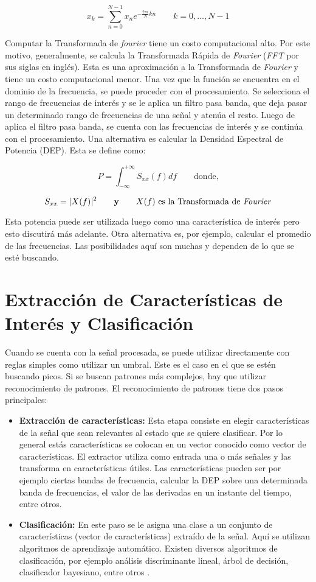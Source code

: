 $$ x_{k} = \sum_{n=0}^{N-1} x_{n}e^{-\frac{2 \pi i}{N}kn} \qquad k = 0,\hdots, N - 1 $$

Computar la Transformada de \emph{fourier} tiene un costo computacional alto. Por este motivo, generalmente, se calcula la Transformada Rápida de \emph{Fourier} (\emph{FFT} por sus siglas en inglés). Esta es una aproximación a la Transformada de \emph{Fourier} y tiene un costo computacional menor. Una vez que la función se encuentra en el dominio de la frecuencia, se puede proceder con el procesamiento. Se selecciona el rango de frecuencias de interés y se le aplica un filtro pasa banda, que deja pasar un determinado rango de frecuencias de una señal y atenúa el resto. Luego de aplica el filtro pasa banda,  se cuenta con las frecuencias de interés y se continúa con el procesamiento. Una alternativa es calcular la Densidad Espectral de Potencia (DEP). Esta se define como:

$$ P = \int_{-\infty}^{+\infty} S_{xx} (f) df \qquad  \textrm{donde,}$$

$$ S_{xx} = |X(f)|^{2} \qquad \textbf{y} \qquad X(f) \textrm{ es la Transformada de \emph{Fourier}} $$

Esta potencia puede ser utilizada luego como una característica de interés pero esto discutirá más adelante. Otra alternativa  es, por ejemplo, calcular el promedio de las frecuencias. Las posibilidades aquí son muchas y dependen de lo que se esté buscando.

\section{Extracción de Características de Interés y Clasificación}

Cuando se cuenta con la señal procesada, se puede utilizar directamente con reglas simples como utilizar un umbral. Este es el caso en el que se estén buscando picos. Si se buscan patrones más complejos, hay que utilizar reconocimiento de patrones. El reconocimiento de patrones tiene dos pasos principales:

\begin{itemize}
  \item \textbf{Extracción de características:} Esta etapa consiste en elegir características de la señal que sean relevantes al estado que se quiere clasificar. Por lo general estás características se colocan en un vector conocido como vector de características. El extractor utiliza como entrada una o más señales y las transforma en características útiles. Las características pueden ser por ejemplo ciertas bandas de frecuencia, calcular la DEP sobre una determinada banda de frecuencias, el valor de las derivadas en un instante del tiempo, entre otros. 
  \item \textbf{Clasificación:} En este paso se le asigna una clase a un conjunto de características (vector de características) extraído de la señal. Aquí se utilizan algoritmos de aprendizaje automático. Existen diversos algoritmos de clasificación, por ejemplo análisis discriminante lineal, árbol de decisión, clasificador bayesiano, entre otros \cite{eeg-tutorial}.
\end{itemize}

